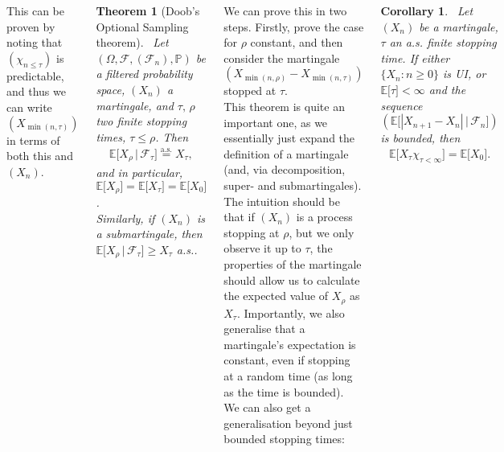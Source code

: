 \documentclass{tikzposter} %
\newtheorem{theorem}{Theorem}
\newtheorem{corollary}{Corollary}
\begin{document}
\begin{columns}
{    This can be proven by noting that $(\chi_{n \le \tau})$ is predictable, and thus we can write $(X_{\min(n,\tau)})$ in terms of both this and $(X_{n})$. \\

    \begin{theorem}[Doob's Optional Sampling theorem]
      \ Let $(\Omega, \mathcal{F}, (\mathcal{F}_{n}), \mathbb{P})$ be a filtered probability space, $(X_{n})$ a martingale, and $\tau,\,\rho$ two finite stopping times, $\tau \le \rho$. Then
      \begin{align*}
        \mathbb{E}\big[X_{\rho} \,|\, \mathcal{F}_{\tau}\big] \overset{\mathrm{a.s.}}{=} X_{\tau},
      \end{align*}
      and in particular, $\mathbb{E}\big[X_{\rho}\big] = \mathbb{E}\big[X_{\tau}\big] = \mathbb{E}\big[X_{0}\big]$. \\

      Similarly, if $(X_{n})$ is a submartingale, then $\mathbb{E}\big[X_{\rho}\,|\, \mathcal{F}_{\tau}\big] \ge X_{\tau}$ a.s..
    \end{theorem}
    \hphantom{}

    We can prove this in two steps. Firstly, prove the case for $\rho$ constant, and then consider the martingale $(X_{\min(n,\rho)}-X_{\min(n,\tau)})$ stopped at $\tau$. \\

    This theorem is quite an important one, as we essentially just expand the definition of a martingale (and, via decomposition, super- and submartingales). The intuition should be that if $(X_{n})$ is a process stopping at $\rho$, but we only observe it up to $\tau$, the properties of the martingale should allow us to calculate the expected value of $X_{\rho}$ as $X_{\tau}$. Importantly, we also generalise that a martingale's expectation is constant, even if stopping at a random time (as long as the time is bounded). \\

    We can also get a generalisation beyond just bounded stopping times:
    \begin{corollary}
      \ Let $(X_{n})$ be a martingale, $\tau$ an a.s. finite stopping time. If either $\{X_{n} : n \ge 0\}$ is UI, or $\mathbb{E}\big[\tau\big] < \infty$ and the sequence $\displaystyle        \left(\mathbb{E}\big[|X_{n+1}-X_{n}| \,\big|\, \mathcal{F}_{n}\big]\right)$ is bounded, then
      \begin{align*}
        \mathbb{E}\big[X_{\tau} \chi_{\tau < \infty}\big] = \mathbb{E}\big[X_{0}\big].
      \end{align*}
    \end{corollary}

}
\end{columns}
\end{document}
